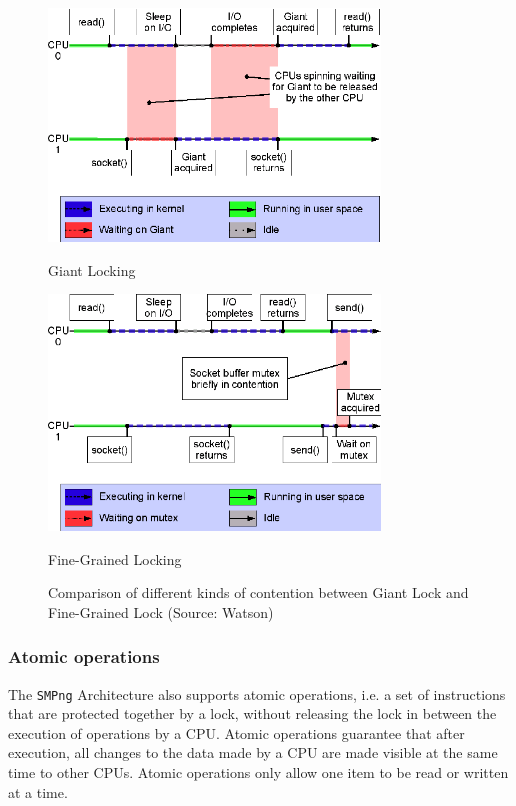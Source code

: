 \documentclass[12pt, dvipsnames, a4paper]{article}
\newcommand{\code}[1]{\texttt{#1}}
\begin{document}
\begin{figure}[!h]
	\begin{minipage}[c]{0.4\linewidth}
		\centering
		\includegraphics[width = 250pt]{assets/other_diagrams/figureA.png}
		\caption{Giant Locking}
	\end{minipage}\hfill
	\begin{minipage}[c]{0.5\linewidth}
		\centering
		\includegraphics[width = 250pt]{assets/other_diagrams/figureB.png}
		\caption{Fine-Grained Locking}
	\end{minipage}
	\caption{Comparison of different kinds of contention between Giant Lock and Fine-Grained Lock (Source: Watson) \cite{watson}}
\end{figure}

\subsubsection{Atomic operations}
The \code{SMPng} Architecture also supports atomic operations, i.e. a set of instructions that are protected together by a lock, without releasing the lock in between the execution of operations by a CPU. Atomic operations guarantee that after execution, all changes to the data made by a CPU are made visible at the same time to other CPUs. Atomic operations only allow one item to be read or written at a time.
\end{document}

